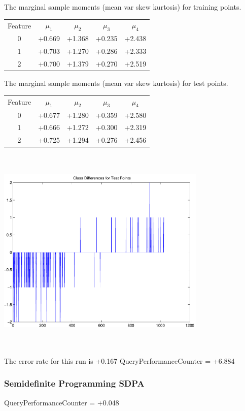 \documentclass[9pt]{article}
\theoremstyle{plain}
\theoremstyle{definition}
\theoremstyle{remark}
\numberwithin{equation}{section}
\begin{document}
The marginal sample moments (mean var skew kurtosis) for training points.\newline
\begin{tabular}{ c |  c  c  c  c}
Feature & $\mu_1$ & $\mu_2$ & $\mu_3$ & $\mu_4$ \\
0 & +0.669 & +1.368 & +0.235& +2.438 \\
\hline
1 & +0.703 & +1.270 & +0.286& +2.333 \\
\hline
2 & +0.700 & +1.379 & +0.270& +2.519 \\
\hline
\end{tabular}
\newline
The marginal sample moments (mean var skew kurtosis) for test points.\newline
\begin{tabular}{ c | c  c  c  c}
Feature & $\mu_1$ & $\mu_2$ & $\mu_3$ & $\mu_4$ \\
0 & +0.677 & +1.280 & +0.359& +2.580\\
\hline
1 & +0.666 & +1.272 & +0.300& +2.319\\
\hline
2 & +0.725 & +1.294 & +0.276& +2.456\\
\hline
\end{tabular}\newline
\includegraphics[width=10.0cm,height=10.0cm]{classDiffs.pdf}

The error rate for this run is +0.167\newline
QueryPerformanceCounter  =  +6.884
\subsubsection{Semidefinite Programming SDPA}
QueryPerformanceCounter  =  +0.048
\end{document}
